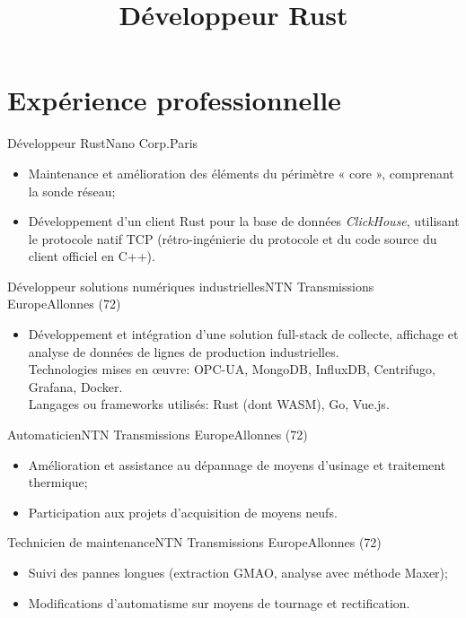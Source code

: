 \documentclass[a4paper,french,10pt]{moderncv}
\title{Développeur Rust}
\begin{document}
\maketitle{}

\section{Expérience professionnelle}
%
{Développeur Rust}{Nano Corp.}{Paris}{}{%
  \begin{itemize}
    \item Maintenance et amélioration des éléments du périmètre « core », comprenant la sonde réseau;
    \item Développement d'un client Rust pour la base de données \textit{ClickHouse}, utilisant le protocole natif
          TCP (rétro-ingénierie du protocole et du code source du client officiel en C++).
  \end{itemize}
}
%
{Développeur solutions numériques industrielles}{NTN Transmissions Europe}{Allonnes (72)}{}{%
  \begin{itemize}
    \item Développement et intégration d'une solution full-stack de collecte, affichage
          et analyse de données de lignes de production industrielles.\\
          Technologies mises en œuvre: OPC-UA, MongoDB, InfluxDB, Centrifugo, Grafana, Docker.\\
          Langages ou frameworks utilisés: Rust (dont WASM), Go, Vue.js.
  \end{itemize}
}
%
{Automaticien}{NTN Transmissions Europe}{Allonnes (72)}{}{%
  \begin{itemize}
    \item Amélioration et assistance au dépannage de moyens d'usinage
          et traitement thermique;
    \item Participation aux projets d'acquisition de moyens neufs.
  \end{itemize}
}
%
{Technicien de maintenance}{NTN Transmissions Europe}{Allonnes (72)}{}{%
  \begin{itemize}
    \item Suivi des pannes longues (extraction GMAO, analyse avec méthode
          Maxer);
    \item Modifications d'automatisme sur moyens de tournage et rectification.
  \end{itemize}
}
%
\end{document}
